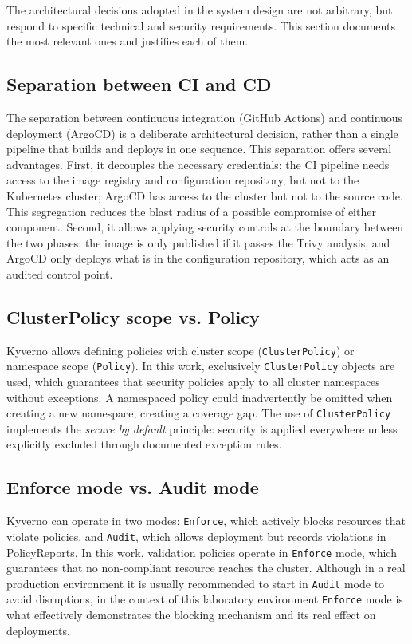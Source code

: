 The architectural decisions adopted in the system design are not arbitrary, but respond to specific technical and security requirements. This section documents the most relevant ones and justifies each of them.

\subsection{Separation between CI and CD}

The separation between continuous integration (GitHub Actions) and continuous deployment (ArgoCD) is a deliberate architectural decision, rather than a single pipeline that builds and deploys in one sequence. This separation offers several advantages. First, it decouples the necessary credentials: the CI pipeline needs access to the image registry and configuration repository, but not to the Kubernetes cluster; ArgoCD has access to the cluster but not to the source code. This segregation reduces the blast radius of a possible compromise of either component. Second, it allows applying security controls at the boundary between the two phases: the image is only published if it passes the Trivy analysis, and ArgoCD only deploys what is in the configuration repository, which acts as an audited control point.

\subsection{ClusterPolicy scope vs. Policy}

Kyverno allows defining policies with cluster scope (\texttt{ClusterPolicy}) or namespace scope (\texttt{Policy}). In this work, exclusively \texttt{ClusterPolicy} objects are used, which guarantees that security policies apply to all cluster namespaces without exceptions. A namespaced policy could inadvertently be omitted when creating a new namespace, creating a coverage gap. The use of \texttt{ClusterPolicy} implements the \textit{secure by default} principle: security is applied everywhere unless explicitly excluded through documented exception rules.

\subsection{Enforce mode vs. Audit mode}

Kyverno can operate in two modes: \texttt{Enforce}, which actively blocks resources that violate policies, and \texttt{Audit}, which allows deployment but records violations in PolicyReports. In this work, validation policies operate in \texttt{Enforce} mode, which guarantees that no non-compliant resource reaches the cluster. Although in a real production environment it is usually recommended to start in \texttt{Audit} mode to avoid disruptions, in the context of this laboratory environment \texttt{Enforce} mode is what effectively demonstrates the blocking mechanism and its real effect on deployments.

